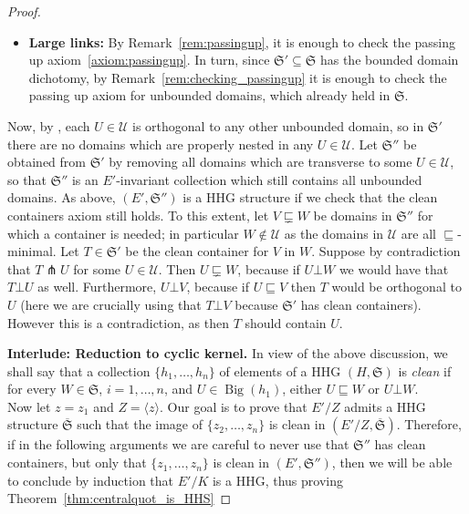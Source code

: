 \documentclass[svgnames]{amsart}
\theoremstyle{plain}
\theoremstyle{definition}
\newcommand{\cal}[1]{\mathcal{#1}}
\newcommand{\frakS}{\mathfrak{S}}
\newcommand{\Bigdom}[1]{\operatorname{Big}\left(#1\right)}
\newcommand{\nest}{\sqsubseteq}
\newcommand{\propnest}{\sqsubsetneq}
\newcommand{\orth}{\bot}
\newcommand{\trans}{\pitchfork}
\newcommand{\ofS}{\overline{\frakS}}
\begin{document}
\begin{proof}
\begin{itemize}
\item \textbf{Large links:} By Remark~\ref{rem:passingup}, it is enough to check the passing up axiom~\ref{axiom:passingup}. In turn, since $\frakS'\subseteq \frakS$ has the bounded domain dichotomy, by Remark~\ref{rem:checking_passingup} it is enough to check the passing up axiom for unbounded domains, which already held in  $\frakS$.
\end{itemize}

Now, by \cite[Lemma 3.1 and Proposition 3.4]{ANS:UEG}, each $U\in \cal U$ is orthogonal to any other unbounded domain, so in $\frakS'$ there are no domains which are properly nested in any $U\in \cal U$. Let $\frakS''$ be obtained from $\frakS'$ by removing all domains which are transverse to some $U\in \cal U$, so that $\frakS''$ is an $E'$-invariant collection which still contains all unbounded domains. As above, $(E',\frakS'')$ is a HHG structure if we check that the clean containers axiom still holds. To this extent, let $V\propnest W$ be domains in $\frakS''$ for which a container is needed; in particular $W\not\in \cal U$ as the domains in $\cal U$ are all $\nest$-minimal. Let $T\in \frakS'$ be the clean container for $V$ in $W$. Suppose by contradiction that $T\trans U$ for some $U\in \cal U$. Then $U\propnest W$, because if $U\orth W$ we would have that $T\orth U$ as well. Furthermore, $U\orth V$, because if $U\nest V$ then $T$ would be orthogonal to $U$ (here we are crucially using that $T\orth V$ because $\frakS'$ has clean containers). However this is a contradiction, as then $T$ should contain $U$.

\par\medskip \textbf{Interlude: Reduction to cyclic kernel.}
In view of the above discussion, we shall say that a collection $\{h_1,\ldots, h_n\}$ of elements of a HHG $(H,\frakS)$ is \emph{clean} if for every $W\in \frakS$, $i=1,\ldots,n$, and $U\in \Bigdom{h_1}$, either $U\nest W$ or $U\orth W$.
\\
Now let $z=z_1$ and $Z=\langle z\rangle$. Our goal is to prove that $E'/Z$ admits a HHG structure $\ofS$ such that the image of $\{z_2,\ldots, z_n\}$ is clean in $(E'/Z,\ofS)$. Therefore, if in the following arguments we are careful to never use that $\frakS''$ has clean containers, but only that $\{z_1,\ldots,z_n\}$ is clean in $(E',\frakS'')$, then we will be able to conclude by induction that $E'/K$ is a HHG, thus proving Theorem~\ref{thm:centralquot_is_HHS}
  
    

    




\end{proof}
\end{document}
